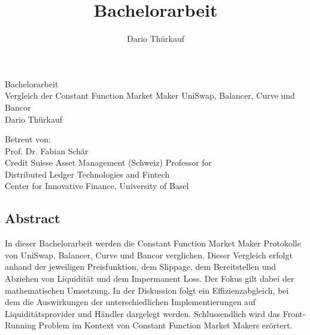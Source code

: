 \documentclass[12pt,a4paper,titlepage,oneside,english]{article}
\title{Bachelorarbeit}
\author{Dario Thürkauf}
\begin{document}
\begin{center}
\vspace{1em}
\large{Bachelorarbeit}\\
\huge Vergleich der Constant Function Market Maker UniSwap, Balancer, Curve und Bancor \\
\Large \vspace{1em}
Dario Thürkauf
\end{center}

\vspace{1em}
\normalsize
\begin{flushleft}
Betreut von:\\ 
Prof. Dr. Fabian Schär \\
Credit Suisse Asset Management (Schweiz) Professor for \\ 
Distributed Ledger Technologies and Fintech \\
Center for Innovative Finance, University of Basel
\end{flushleft}

\vspace{1em}
\onehalfspacing
\begin{center}
\section*{Abstract}
\end{center}

In dieser Bachelorarbeit werden die Constant Function Market Maker Protokolle von UniSwap, Balancer, Curve und Bancor verglichen. Dieser Vergleich erfolgt anhand der jeweiligen Preisfunktion, dem Slippage, dem Bereitstellen und Abziehen von Liquidität und dem Impermanent Loss. Der Fokus gilt dabei der mathematischen Umsetzung. In der Diskussion folgt ein Effizienzabgleich, bei dem die Auswirkungen der unterschiedlichen Implementierungen auf Liquiditätsprovider und Händler dargelegt werden. Schlussendlich wird das Front-Running Problem im Kontext von Constant Function Market Makers erörtert. \\
\end{document}
